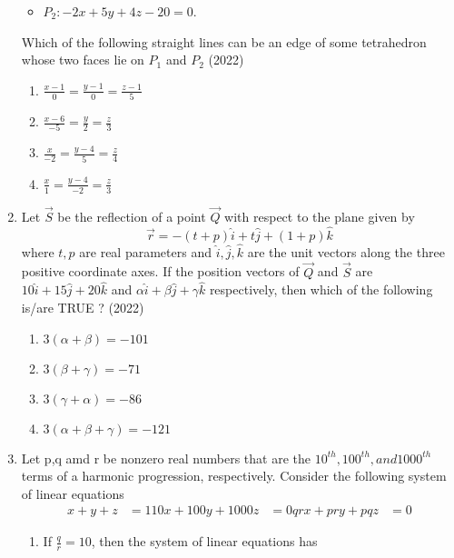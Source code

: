 \begin{enumerate}[label=\thesubsection.\arabic*.,ref=\thesubsection.\theenumi]
\begin{itemize}
 \item $P_2 : -2x + 5y + 4z - 20 = 0$.
\end{itemize}
Which of the following straight lines can be an edge of some tetrahedron whose two faces lie on $P_1$
and $P_2$ 
  \hfill (2022)
\begin{multicols}{2}
\begin{enumerate}
	 \item $\frac{x-1}{0} =\frac{y-1}{0} =\frac{z-1}{5}$ 
	 \item $\frac{x-6}{-5} =\frac{y}{2} =\frac{z}{3}$
	 \item $\frac{x}{-2} =\frac{y-4}{5} =\frac{z}{4}$
	 \item $\frac{x}{1} =\frac{y-4}{-2} =\frac{z}{3}$
\end{enumerate}
\end{multicols}
 \item  Let $\vec{S}$ be the reflection of a point $\vec{Q}$ with respect to the plane given by
$$\overrightarrow{r}=-(t+p)\hat{i}+t\hat{j}+(1+p)\hat{k}$$
 where $t, p$ are real parameters and $\hat{i}, \hat{j} ,\hat{k}$ are the unit vectors along the three positive coordinate 
axes. If the position vectors of $\vec{Q}$ and $\vec{S}$ are $10\hat{i}+ 15\hat{j}+ 20\hat{k} $ and $\alpha\hat{i}+ \beta\hat{j}+ \gamma\hat{k}$ respectively, then which of the following is/are TRUE ?
	\hfill (2022)
\begin{multicols}{2}
\begin{enumerate}
  \item $3(\alpha + \beta) = -101$
  \item $3(\beta + \gamma) = -71$
  \item $3(\gamma + \alpha) = -86$
  \item $3(\alpha + \beta + \gamma) = -121$
\end{enumerate}
\end{multicols}
 \item Let p,q amd r  be nonzero real numbers that are the $10^{th}, 100^{th}, and 1000^{th}$ terms of a harmonic progression, respectively. Consider the following system of linear equations
\begin{align*}
	x + y + z &= 1
	10x + 100y + 1000z &= 0
	qr x + pr y + pq z &= 0
\end{align*}
\begin{multicols}{2}
	\begin{enumerate}[label=(\Roman*),itemsep=1ex]
		\item	If \( \frac{q}{r} = 10 \), then the system of linear equations has 

\end{enumerate}
\end{multicols}
\end{enumerate}
